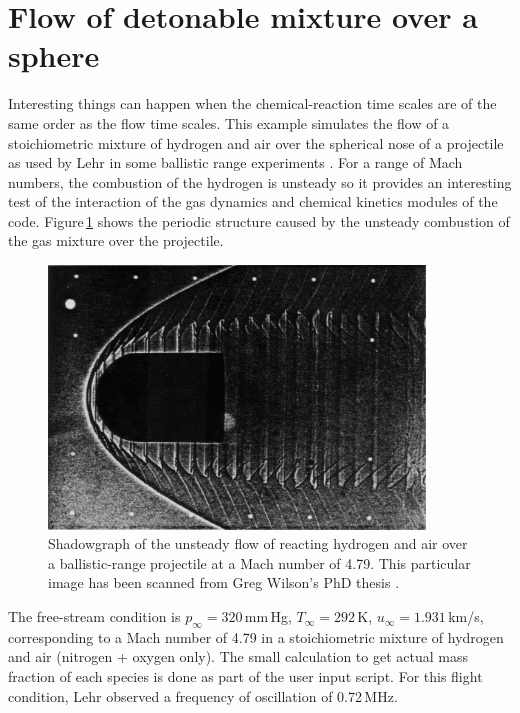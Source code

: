 
\newpage
\section{Flow of detonable mixture over a sphere}
%
Interesting things can happen when the chemical-reaction time scales
are of the same order as the flow time scales. 
This example simulates the flow of a stoichiometric mixture of hydrogen and air over
the spherical nose of a projectile as used by Lehr in some ballistic range experiments
\cite{lehr_1972}.
For a range of Mach numbers, the combustion of the hydrogen is unsteady so it provides
an interesting test of the interaction of the gas dynamics and chemical kinetics modules
of the code.
Figure\,\ref{lehr-expt-M479-fig} shows the periodic structure caused by the unsteady combustion 
of the gas mixture over the projectile.

\begin{figure}[htbp]
\begin{center}
\includegraphics[width=10cm]{../2D/lehr-479/lehr-M4p79-scanned-image-from-wilson-thesis.jpg}
\end{center}
\caption{Shadowgraph of the unsteady flow of reacting hydrogen and air over a ballistic-range
  projectile at a Mach number of 4.79.  This particular image has been scanned from Greg Wilson's
  PhD thesis \cite{wilson_1991}.}
\label{lehr-expt-M479-fig}
\end{figure}

\medskip
The free-stream condition is $p_{\infty} = 320$\,mm\,Hg, $T_{\infty} = 292$\,K,
$u_{\infty} = 1.931$\,km/s, corresponding to a Mach number of 4.79 in a stoichiometric mixture
of hydrogen and air (nitrogen + oxygen only).
The small calculation to get actual mass fraction of each species is done as part of the user input script.
For this flight condition, Lehr observed a frequency of oscillation of 0.72\,MHz. 

